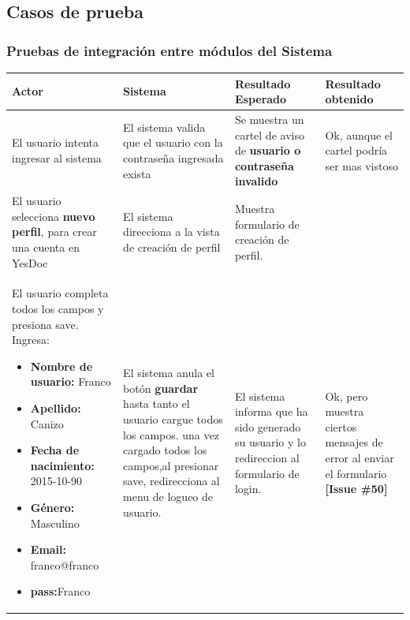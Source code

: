 \documentclass[a4paper,12pt]{article}
\begin{document}
\subsection{Casos de prueba}

\subsubsection{Pruebas  de  integración  entre módulos del Sistema}












\begin{longtable}{|p{4cm}|p{4cm}|p{4cm}|p{3cm}|}
\hline
Actor  & Sistema& Resultado Esperado & Resultado obtenido \\ \hline

El usuario intenta ingresar al sistema & El sistema valida que el usuario con la contraseña ingresada exista 
& Se muestra un cartel de aviso de \textbf{usuario o contraseña invalido} 
& Ok, aunque el cartel podría ser mas vistoso 
\\ \hline



El usuario selecciona \textbf{nuevo perfil}, para
crear una cuenta en YesDoc 
& El sistema direcciona a la vista de creación de perfil
& Muestra formulario de creación de perfil.
&
\\ \hline



 El usuario completa todos los campos y presiona save.
 Ingresa:
\begin{itemize}
	\item \textbf{Nombre de usuario:} Franco
	\item \textbf{Apellido:} Canizo
	\item \textbf{Fecha de nacimiento: }2015-10-90
	\item \textbf{Género: }Masculino
	\item \textbf{Email: }franco@franco
	\item \textbf{pass:}Franco

\end{itemize}
& El sistema anula el botón \textbf{guardar }hasta tanto el usuario cargue todos los campos. una vez cargado todos los campos,al presionar save, redirecciona al menu
de logueo de usuario.
& El sistema informa que ha sido generado su usuario y lo redireccion al formulario de login.
& Ok, pero muestra ciertos mensajes de error al enviar el formulario \textbf{[Issue \#50]}
\\ \hline




\end{longtable}
\end{document}
